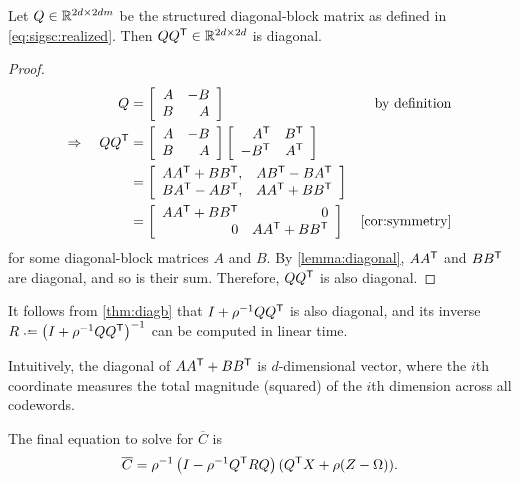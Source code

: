 \documentclass{article}
\begin{document}
\begin{theorem}
Let $Q\in\mathbb{R}^{2d\times 2dm}$ be the structured diagonal-block matrix as defined in \autoref{eq:sigsc:realized}.  Then $QQ^\mathsf{T} \in \mathbb{R}^{2d\times 2d}$ is diagonal.
\label{thm:diagb}
\end{theorem}
\begin{proof}
\begin{align*}
Q &= \left[\begin{array}{rr} A & -B\\ B & A \end{array} \right] & \text{by definition}\\
\Rightarrow \quad QQ\trans &= \left[\begin{array}{rr} A & -B\\ B & A\end{array} \right]\left[\begin{array}{rr} A\trans & B\trans\\ -B\trans & A\trans\end{array} \right]\\
&= \left[\begin{array}{rr} AA\trans  + BB\trans, & AB\trans - BA\trans\\ BA\trans - AB\trans, & AA\trans + BB\trans \end{array}\right]\\
&= \left[\begin{array}{rr} AA\trans  + BB\trans & 0 \\ 0 & AA\trans + BB\trans \end{array}\right] & \autoref{cor:symmetry}
\end{align*}
for some diagonal-block matrices $A$ and $B$. 
By \autoref{lemma:diagonal}, $AA^\mathsf{T}$ and $BB^\mathsf{T}$ are diagonal, and so is their sum.  Therefore, $QQ^\mathsf{T}$ is also diagonal.
\end{proof}
It follows from \autoref{thm:diagb} that $I + \rho^{-1}QQ^\mathsf{T}$ is also diagonal, and its inverse $R\defeq\left(I + \rho^{-1}QQ\trans\right)^{-1}$ can be computed in linear time.

Intuitively, the diagonal of $AA^\mathsf{T} + BB^\mathsf{T}$ is $d$-dimensional vector, where the $i$th coordinate measures the total magnitude (squared) of the $i$th dimension across all codewords.

The final equation to solve for $\overline{C}$ is
\begin{align}
\overline{C} = \rho^{-1}\left( I - \rho^{-1} Q^\mathsf{T} R Q\right) (Q^\mathsf{T} X + \rho(Z-\Omega)).\label{eq:cstep}
\end{align}
\end{document}

